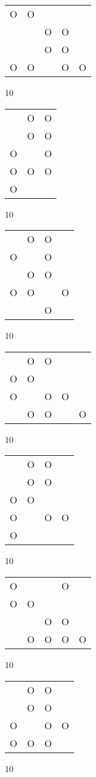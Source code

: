 \begin{tabular}{|m{0.2cm}m{0.2cm}m{0.2cm}m{0.2cm}m{0.2cm}|}\hline
O&O& & & \\
 & &O&O& \\
 & &O&O& \\
O&O& &O&O\\
\hline\end{tabular}10
\begin{tabular}{|m{0.2cm}m{0.2cm}m{0.2cm}|}\hline
 &O&O\\
 &O&O\\
O& &O\\
O&O&O\\
O& & \\
\hline\end{tabular}10
\begin{tabular}{|m{0.2cm}m{0.2cm}m{0.2cm}m{0.2cm}|}\hline
 &O&O& \\
O& &O& \\
 &O&O& \\
O&O& &O\\
 & &O& \\
\hline\end{tabular}10
\begin{tabular}{|m{0.2cm}m{0.2cm}m{0.2cm}m{0.2cm}m{0.2cm}|}\hline
 &O&O& & \\
O&O& & & \\
O& &O&O& \\
 &O&O& &O\\
\hline\end{tabular}10
\begin{tabular}{|m{0.2cm}m{0.2cm}m{0.2cm}m{0.2cm}|}\hline
 &O&O& \\
 &O&O& \\
O&O& & \\
O& &O&O\\
O& & & \\
\hline\end{tabular}10
\begin{tabular}{|m{0.2cm}m{0.2cm}m{0.2cm}m{0.2cm}m{0.2cm}|}\hline
O& & &O& \\
O&O& & & \\
 & &O&O& \\
 &O&O&O&O\\
\hline\end{tabular}10
\begin{tabular}{|m{0.2cm}m{0.2cm}m{0.2cm}m{0.2cm}|}\hline
 &O&O& \\
 &O&O& \\
O& &O&O\\
O&O&O& \\
\hline\end{tabular}10
